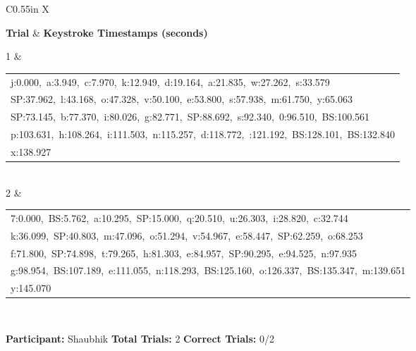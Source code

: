 \documentclass[10pt,a4paper]{article}
\begin{document}
\begin{center}
\begin{tabularx}{\textwidth}{
    C{0.55in}
    X
}
\toprule

\textbf{Trial} &
\textbf{Keystroke Timestamps (seconds)}
\\

\midrule

1 &
\begin{tabular}[t]{@{}l@{}}
j:0.000,\ a:3.949,\ c:7.970,\ k:12.949,\ d:19.164,\ a:21.835,\ w:27.262,\ s:33.579\\
SP:37.962,\ l:43.168,\ o:47.328,\ v:50.100,\ e:53.800,\ s:57.938,\ m:61.750,\ y:65.063\\
SP:73.145,\ b:77.370,\ i:80.026,\ g:82.771,\ SP:88.692,\ s:92.340,\ 0:96.510,\ BS:100.561\\
p:103.631,\ h:108.264,\ i:111.503,\ n:115.257,\ d:118.772,\ 
:121.192,\ BS:128.101,\ BS:132.840\\
x:138.927
\end{tabular}
\\[0.12cm]

2 &
\begin{tabular}[t]{@{}l@{}}
7:0.000,\ BS:5.762,\ a:10.295,\ SP:15.000,\ q:20.510,\ u:26.303,\ i:28.820,\ c:32.744\\
k:36.099,\ SP:40.803,\ m:47.096,\ o:51.294,\ v:54.967,\ e:58.447,\ SP:62.259,\ o:68.253\\
f:71.800,\ SP:74.898,\ t:79.265,\ h:81.303,\ e:84.957,\ SP:90.295,\ e:94.525,\ n:97.935\\
g:98.954,\ BS:107.189,\ e:111.055,\ n:118.293,\ BS:125.160,\ o:126.337,\ BS:135.347,\ m:139.651\\
y:145.070
\end{tabular}
\\[0.12cm]

\bottomrule
\end{tabularx}
\end{center}

\vfill


\noindent
\textbf{Participant:} Shaubhik
\hfill
\textbf{Total Trials:} 2
\hfill
\textbf{Correct Trials:} 0/2
\end{document}
